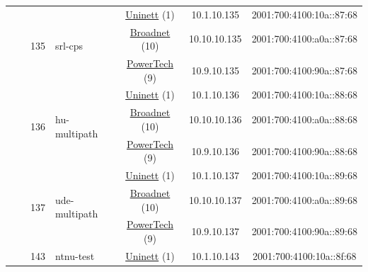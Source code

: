 \begin{small}
\begin{center}
\begin{longtable}{|c|c|c|c|c|c|c|c|}
  &  & \multirow{3}{*}{\tiny{135}} & \multicolumn{1}{|l|}{\multirow{3}{*}{\tiny{srl-cps}}} & \multicolumn{2}{|c|}{\tiny{\href{https://www.uninett.no}{Uninett} (1)}} & \tiny{10.1.10.135} & \tiny{2001:700:4100:10a::87:68} \\* \cline{5-5}\cline{6-6}\cline{7-7}\cline{8-8}
  &  &  &  & \multicolumn{2}{|c|}{\tiny{\href{https://www.broadnet.no}{Broadnet} (10)}} & \tiny{10.10.10.135} & \tiny{2001:700:4100:a0a::87:68} \\* \cline{5-5}\cline{6-6}\cline{7-7}\cline{8-8}
  &  &  &  & \multicolumn{2}{|c|}{\tiny{\href{http://www.powertech.no}{PowerTech} (9)}} & \tiny{10.9.10.135} & \tiny{2001:700:4100:90a::87:68} \\* \cline{3-3}\cline{4-4}\cline{5-5}\cline{6-6}\cline{7-7}\cline{8-8}
  &  & \multirow{3}{*}{\tiny{136}} & \multicolumn{1}{|l|}{\multirow{3}{*}{\tiny{hu-multipath}}} & \multicolumn{2}{|c|}{\tiny{\href{https://www.uninett.no}{Uninett} (1)}} & \tiny{10.1.10.136} & \tiny{2001:700:4100:10a::88:68} \\* \cline{5-5}\cline{6-6}\cline{7-7}\cline{8-8}
  &  &  &  & \multicolumn{2}{|c|}{\tiny{\href{https://www.broadnet.no}{Broadnet} (10)}} & \tiny{10.10.10.136} & \tiny{2001:700:4100:a0a::88:68} \\* \cline{5-5}\cline{6-6}\cline{7-7}\cline{8-8}
  &  &  &  & \multicolumn{2}{|c|}{\tiny{\href{http://www.powertech.no}{PowerTech} (9)}} & \tiny{10.9.10.136} & \tiny{2001:700:4100:90a::88:68} \\* \cline{3-3}\cline{4-4}\cline{5-5}\cline{6-6}\cline{7-7}\cline{8-8}
  &  & \multirow{3}{*}{\tiny{137}} & \multicolumn{1}{|l|}{\multirow{3}{*}{\tiny{ude-multipath}}} & \multicolumn{2}{|c|}{\tiny{\href{https://www.uninett.no}{Uninett} (1)}} & \tiny{10.1.10.137} & \tiny{2001:700:4100:10a::89:68} \\* \cline{5-5}\cline{6-6}\cline{7-7}\cline{8-8}
  &  &  &  & \multicolumn{2}{|c|}{\tiny{\href{https://www.broadnet.no}{Broadnet} (10)}} & \tiny{10.10.10.137} & \tiny{2001:700:4100:a0a::89:68} \\* \cline{5-5}\cline{6-6}\cline{7-7}\cline{8-8}
  &  &  &  & \multicolumn{2}{|c|}{\tiny{\href{http://www.powertech.no}{PowerTech} (9)}} & \tiny{10.9.10.137} & \tiny{2001:700:4100:90a::89:68} \\* \cline{3-3}\cline{4-4}\cline{5-5}\cline{6-6}\cline{7-7}\cline{8-8}
  &  & \multirow{3}{*}{\tiny{143}} & \multicolumn{1}{|l|}{\multirow{3}{*}{\tiny{ntnu-test}}} & \multicolumn{2}{|c|}{\tiny{\href{https://www.uninett.no}{Uninett} (1)}} & \tiny{10.1.10.143} & \tiny{2001:700:4100:10a::8f:68} \\* \cline{5-5}\cline{6-6}\cline{7-7}\cline{8-8}

\end{longtable}
\end{center}
\end{small}
